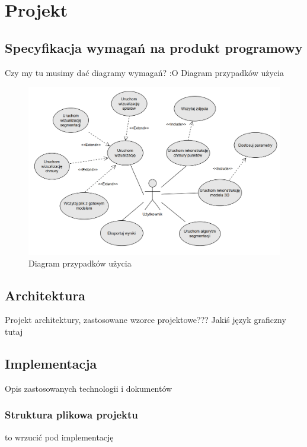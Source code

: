 \section{Projekt}
\subsection{Specyfikacja wymagań na produkt programowy}
Czy my tu musimy dać diagramy wymagań? :O
Diagram przypadków użycia

\begin{figure}[!htb]
  \includegraphics[width=1.0\linewidth]{img/diagram_pu_3.png}
  \caption{Diagram przypadków użycia}\label{fig:use_case_diagram}
\end{figure}

\subsection{Architektura}
Projekt architektury, zastosowane wzorce projektowe???
Jakiś język graficzny tutaj

\subsection{Implementacja}
Opis zastosowanych technologii i dokumentów

\subsubsection{Struktura plikowa projektu}

to wrzucić pod implementację

